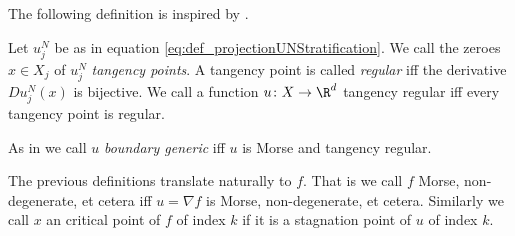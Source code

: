 The following definition is inspired by \cite{Katz2014}.
\begin{definition}
  Let $u^N_j$ be as in equation \eqref{eq:def_projectionUNStratification}.
  We call the zeroes $x\in X_j$ of $u^N_j$ \emph{tangency points}.
  A tangency point is called \emph{regular} iff the derivative $Du^N_j(x)$ is bijective.
  We call a function $u\colon X\to\R^d$ tangency regular iff every tangency point
  is regular.
\end{definition}

As in \cite{Katz2014} we call $u$ \emph{boundary generic} iff $u$ is Morse and tangency regular.

The previous definitions translate naturally to $f$.
That is we call $f$ Morse, non-degenerate, et cetera iff $u=\nabla f$ is Morse, non-degenerate, et cetera.
Similarly we call $x$ an critical point of $f$ of index $k$ if it is a
stagnation point of $u$ of index $k$.

